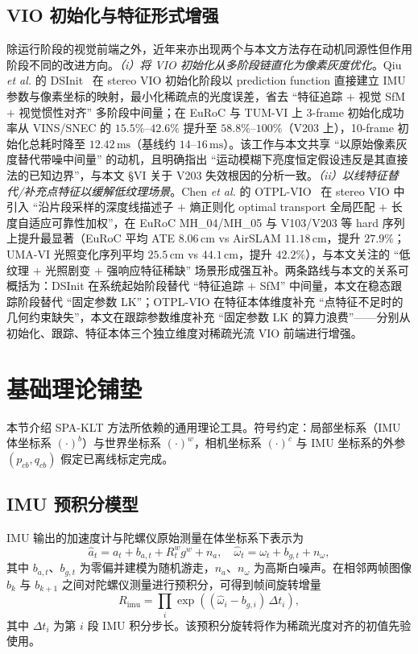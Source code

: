 \documentclass[letterpaper,journal]{IEEEtran}
\begin{document}
\subsection{VIO 初始化与特征形式增强}
除运行阶段的视觉前端之外，近年来亦出现两个与本文方法存在动机同源性但作用阶段不同的改进方向。\textit{（i）将 VIO 初始化从多阶段链直化为像素灰度优化}。Qiu \emph{et al.} 的 DSInit~\cite{qiu2026dsinit} 在 stereo VIO 初始化阶段以 prediction function 直接建立 IMU 参数与像素坐标的映射，最小化稀疏点的光度误差，省去 ``特征追踪 $+$ 视觉 SfM $+$ 视觉惯性对齐'' 多阶段中间量；在 EuRoC 与 TUM-VI 上 3-frame 初始化成功率从 VINS/SNEC 的 $15.5\%$--$42.6\%$ 提升至 $58.8\%$--$100\%$（V203 上），10-frame 初始化总耗时降至 $12.42\,\mathrm{ms}$（基线约 $14$--$16\,\mathrm{ms}$）。该工作与本文共享 ``以原始像素灰度替代带噪中间量'' 的动机，且明确指出 ``运动模糊下亮度恒定假设违反是其直接法的已知边界''，与本文 §VI 关于 V203 失效根因的分析一致。\textit{（ii）以线特征替代/补充点特征以缓解低纹理场景}。Chen \emph{et al.} 的 OTPL-VIO~\cite{chen2026otpl} 在 stereo VIO 中引入 ``沿片段采样的深度线描述子 $+$ 熵正则化 optimal transport 全局匹配 $+$ 长度自适应可靠性加权''，在 EuRoC MH\_04/MH\_05 与 V103/V203 等 hard 序列上提升最显著（EuRoC 平均 ATE $8.06\,\mathrm{cm}$ vs AirSLAM $11.18\,\mathrm{cm}$，提升 $27.9\%$；UMA-VI 光照变化序列平均 $25.5\,\mathrm{cm}$ vs $44.1\,\mathrm{cm}$，提升 $42.2\%$），与本文关注的 ``低纹理 $+$ 光照剧变 $+$ 强响应特征稀缺'' 场景形成强互补。两条路线与本文的关系可概括为：DSInit 在系统起始阶段替代 ``特征追踪 $+$ SfM'' 中间量，本文在稳态跟踪阶段替代 ``固定参数 LK''；OTPL-VIO 在特征本体维度补充 ``点特征不足时的几何约束缺失''，本文在跟踪参数维度补充 ``固定参数 LK 的算力浪费''——分别从初始化、跟踪、特征本体三个独立维度对稀疏光流 VIO 前端进行增强。

\section{基础理论铺垫}
本节介绍 SPA-KLT 方法所依赖的通用理论工具。符号约定：局部坐标系（IMU 体坐标系 $(\cdot)^b$）与世界坐标系 $(\cdot)^w$，相机坐标系 $(\cdot)^c$ 与 IMU 坐标系的外参 $(p_{cb}, q_{cb})$ 假定已离线标定完成。

\subsection{IMU 预积分模型}
IMU 输出的加速度计与陀螺仪原始测量在体坐标系下表示为
\begin{equation}
\hat{a}_t = a_t + b_{a,t} + R_{t}^{w} g^{w} + n_{a},\quad
\hat{\omega}_t = \omega_t + b_{g,t} + n_{\omega},
\label{eq:imu_meas}
\end{equation}
其中 $b_{a,t}$、$b_{g,t}$ 为零偏并建模为随机游走，$n_{a}$、$n_{\omega}$ 为高斯白噪声。在相邻两帧图像 $b_k$ 与 $b_{k+1}$ 之间对陀螺仪测量进行预积分，可得到帧间旋转增量
\begin{equation}
R_{\mathrm{imu}} = \prod_{i} \exp\!\left((\hat{\omega}_{i} - b_{g,i})\, \Delta t_i \right),
\label{eq:imu_preint}
\end{equation}
其中 $\Delta t_i$ 为第 $i$ 段 IMU 积分步长。该预积分旋转将作为稀疏光度对齐的初值先验使用。
\end{document}
